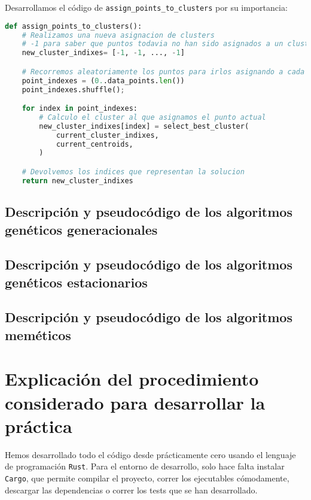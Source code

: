 \documentclass[11pt]{article}
\begin{document}
Desarrollamos el código de \lstinline{assign_points_to_clusters} por su importancia:

\begin{lstlisting}[language=Python, style=Boxed]
def assign_points_to_clusters():
    # Realizamos una nueva asignacion de clusters
    # -1 para saber que puntos todavia no han sido asignados a un cluster
    new_cluster_indixes= [-1, -1, ..., -1]

    # Recorremos aleatoriamente los puntos para irlos asignando a cada cluster
    point_indexes = (0..data_points.len())
    point_indexes.shuffle();

    for index in point_indexes:
        # Calculo el cluster al que asignamos el punto actual
        new_cluster_indixes[index] = select_best_cluster(
            current_cluster_indixes,
            current_centroids,
        )

    # Devolvemos los indices que representan la solucion
    return new_cluster_indixes
\end{lstlisting}

\pagebreak

\subsection{Descripción y pseudocódigo de los algoritmos genéticos generacionales}
\pagebreak
\subsection{Descripción y pseudocódigo de los algoritmos genéticos estacionarios}
\pagebreak
\subsection{Descripción y pseudocódigo de los algoritmos meméticos}
\pagebreak

\section{Explicación del procedimiento considerado para desarrollar la práctica}

Hemos desarrollado todo el código desde prácticamente cero usando el lenguaje de programación \lstinline{Rust}. Para el entorno de desarrollo, solo hace falta instalar \lstinline{Cargo}, que permite compilar el proyecto, correr los ejecutables cómodamente, descargar las dependencias o correr los tests que se han desarrollado.
\end{document}
